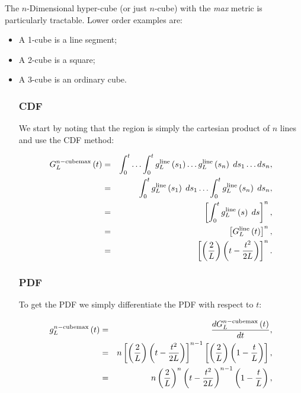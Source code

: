 The $n$-Dimensional hyper-cube (or just $n$-cube) with the {\em max} metric is particularly tractable.
Lower order examples are:
\begin{itemize}

\item A 1-cube is a line segment;

\item A 2-cube is a square;

\item A 3-cube is an ordinary cube.


\subsubsection{CDF}

We start by noting that the region is simply the cartesian product of $n$ lines and use the CDF method:

\begin{eqnarray}
 G^{n-{\rm cube max}}_L\left(t\right) & = & \int_{0}^{t} \ldots \int_{0}^{t}   g^{\rm line}_L\left(s_{1}\right)\ldots g^{\rm line}_L\left(s_{n}\right) \;ds_{1}\ldots ds_{n}, \nonumber \\
 & = & \int_{0}^{t}  g^{\rm line}_L\left(s_{1}\right) \;ds_{1}   \ldots \int_{0}^{t} g^{\rm line}_L\left(s_{n}\right) \;ds_{n},\nonumber \\
 & = & \left[\int_{0}^{t}  g^{\rm line}_L\left(s\right) \;ds \right]^{n},\nonumber \\
 & = & \left[G^{\rm line}_L\left(t\right)\right]^{n} ,\nonumber \\
 & = &  \left[\left(\frac{2}{L}\right)\left( t - \frac{t^2}{2L} \right)\right]^{n}.
\end{eqnarray}

\subsubsection{PDF}
To get the PDF we simply differentiate the PDF with respect to $t$:

\begin{eqnarray}
 g^{n-{\rm cube max}}_L\left(t\right) & = & \frac{d G^{n-{\rm cube max}}_L\left(t\right)}{dt},\nonumber \\
& = &  n\left[\left(\frac{2}{L}\right)\left( t - \frac{t^2}{2L} \right)\right]^{n-1} \left[\left(\frac{2}{L}\right)\left( 1 - \frac{t}{L} \right)\right],\nonumber \\
& = &  n\left(\frac{2}{L}\right)^{n} \left( t - \frac{t^2}{2L} \right)^{n-1}\left( 1 - \frac{t}{L} \right), \nonumber \\
\end{eqnarray} 
 

\end{itemize}
